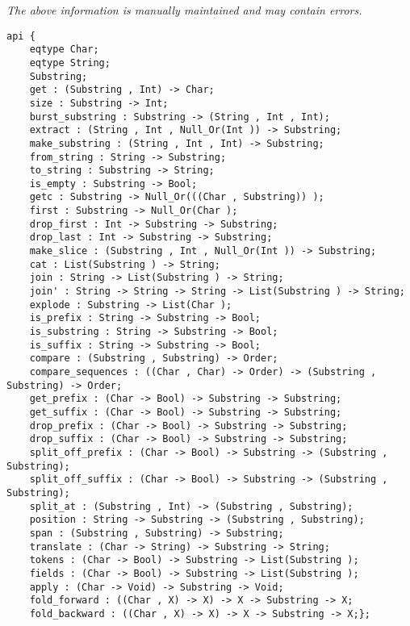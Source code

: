\label{api:Substring}

{\tiny \it The above information is manually maintained and may contain errors.}
\begin{verbatim}
api {
    eqtype Char;
    eqtype String;
    Substring;
    get : (Substring , Int) -> Char;
    size : Substring -> Int;
    burst_substring : Substring -> (String , Int , Int);
    extract : (String , Int , Null_Or(Int )) -> Substring;
    make_substring : (String , Int , Int) -> Substring;
    from_string : String -> Substring;
    to_string : Substring -> String;
    is_empty : Substring -> Bool;
    getc : Substring -> Null_Or(((Char , Substring)) );
    first : Substring -> Null_Or(Char );
    drop_first : Int -> Substring -> Substring;
    drop_last : Int -> Substring -> Substring;
    make_slice : (Substring , Int , Null_Or(Int )) -> Substring;
    cat : List(Substring ) -> String;
    join : String -> List(Substring ) -> String;
    join' : String -> String -> String -> List(Substring ) -> String;
    explode : Substring -> List(Char );
    is_prefix : String -> Substring -> Bool;
    is_substring : String -> Substring -> Bool;
    is_suffix : String -> Substring -> Bool;
    compare : (Substring , Substring) -> Order;
    compare_sequences : ((Char , Char) -> Order) -> (Substring , Substring) -> Order;
    get_prefix : (Char -> Bool) -> Substring -> Substring;
    get_suffix : (Char -> Bool) -> Substring -> Substring;
    drop_prefix : (Char -> Bool) -> Substring -> Substring;
    drop_suffix : (Char -> Bool) -> Substring -> Substring;
    split_off_prefix : (Char -> Bool) -> Substring -> (Substring , Substring);
    split_off_suffix : (Char -> Bool) -> Substring -> (Substring , Substring);
    split_at : (Substring , Int) -> (Substring , Substring);
    position : String -> Substring -> (Substring , Substring);
    span : (Substring , Substring) -> Substring;
    translate : (Char -> String) -> Substring -> String;
    tokens : (Char -> Bool) -> Substring -> List(Substring );
    fields : (Char -> Bool) -> Substring -> List(Substring );
    apply : (Char -> Void) -> Substring -> Void;
    fold_forward : ((Char , X) -> X) -> X -> Substring -> X;
    fold_backward : ((Char , X) -> X) -> X -> Substring -> X;};
\end{verbatim}
